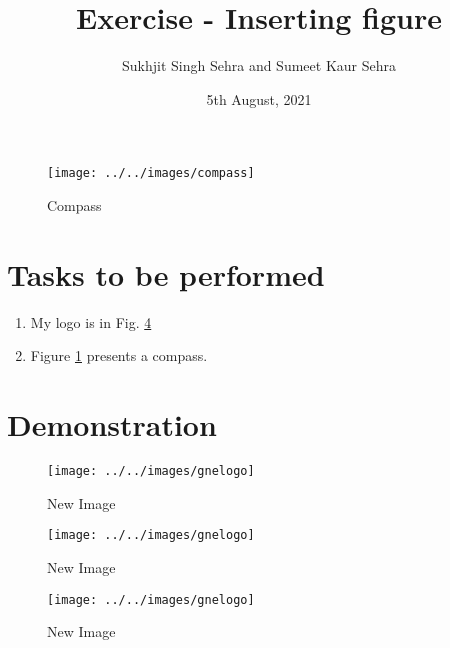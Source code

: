 \documentclass{report}
\title{Exercise - Inserting figure}
\author{Sukhjit Singh Sehra and Sumeet Kaur Sehra}
\date{5th August, 2021}
\begin{document}
\maketitle	
\listoffigures
\begin{figure}
	\centering
	\texttt{[image: ../../images/compass]}
	\caption{Compass}
	\label{fig:compass}
\end{figure}

\section*{Tasks to be performed}
\begin{enumerate}	
\item My logo is in Fig. \ref{fig:gnelogo2}
\item Figure \ref{fig:compass} presents a compass.
\end{enumerate}
\section*{Demonstration}
\begin{figure}
\centering
\texttt{[image: ../../images/gnelogo]}
\caption{New Image}
\label{fig:gnelogo}
\end{figure}
\begin{figure}
\centering
\texttt{[image: ../../images/gnelogo]}
\caption{New Image}
\label{fig:gnelogo1}
\end{figure}
\begin{figure}
\centering
\texttt{[image: ../../images/gnelogo]}
\caption{New Image}
\label{fig:gnelogo2}
\end{figure}
\end{document}

